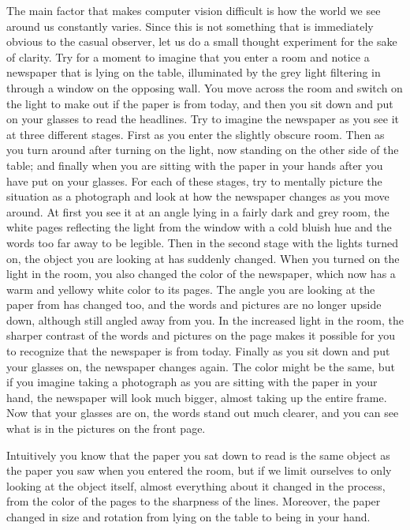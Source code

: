 The main factor that makes computer vision difficult is how the world we 
see around us constantly varies. Since this is not something that is 
immediately obvious to the casual observer, let us do a small thought 
experiment for the sake of clarity. Try for a moment to imagine that you 
enter a room and notice a newspaper that is lying on the table, 
illuminated by the grey light filtering in through a window on the 
opposing wall.  You move across the room and switch on the light to make 
out if the paper is from today, and then you sit down and put on your 
glasses to read the headlines. Try to imagine the newspaper as you see 
it at three different stages. First as you enter the slightly obscure 
room.  Then as you turn around after turning on the light, now standing 
on the other side of the table; and finally when you are sitting with 
the paper in your hands after you have put on your glasses.  For each of 
these stages, try to mentally picture the situation as a photograph and 
look at how the newspaper changes as you move around. At first you see 
it at an angle lying in a fairly dark and grey room, the white pages 
reflecting the light from the window with a cold bluish hue and the 
words too far away to be legible.  Then in the second stage with the 
lights turned on, the object you are looking at has suddenly changed.  
When you turned on the light in the room, you also changed the color of 
the newspaper, which now has a warm and yellowy white color to its 
pages.  The angle you are looking at the paper from has changed too, and 
the words and pictures are no longer upside down, although still angled 
away from you. In the increased light in the room, the sharper contrast 
of the words and pictures on the page makes it possible for you to 
recognize that the newspaper is from today.  Finally as you sit down and 
put your glasses on, the newspaper changes again. The color might be the 
same, but if you imagine taking a photograph as you are sitting with the 
paper in your hand, the newspaper will look much bigger, almost taking 
up the entire frame. Now that your glasses are on, the words stand out 
much clearer, and you can see what is in the pictures on the front page.

Intuitively you know that the paper you sat down to read is the same 
object as the paper you saw when you entered the room, but if we limit 
ourselves to only looking at the object itself, almost everything about 
it changed in the process, from the color of the pages to the sharpness 
of the lines. Moreover, the paper changed in size and rotation from 
lying on the table to being in your hand.  

